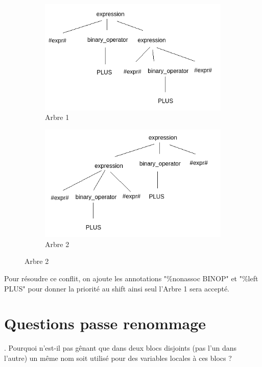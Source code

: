 \documentclass{report}
\begin{document}
    \begin{figure}[h]
        \centering
      \begin{subfigure}{0.45\textwidth}
        \includegraphics[width=\linewidth]{ArbrePLUSPLUS1.png}
        \caption{Arbre 1}
      \end{subfigure}
      \hspace{1cm}
      \begin{subfigure}{0.45\textwidth}
        \includegraphics[width=\linewidth]{ArbrePLUSPLUS2.png}
        \caption{Arbre 2}
      \end{subfigure}
    \end{figure}
    
    Pour résoudre ce conflit, on ajoute les annotations "\%nonassoc BINOP" et "\%left PLUS" pour donner la priorité au shift ainsi seul l'Arbre 1 sera accepté.\\

    \newpage

    \section{Questions passe renommage}
    . Pourquoi n'est-il pas gênant que dans deux blocs disjoints (pas l'un dans l'autre) un même nom soit utilisé pour des variables locales à ces blocs ?\\ 
    
\end{document}
